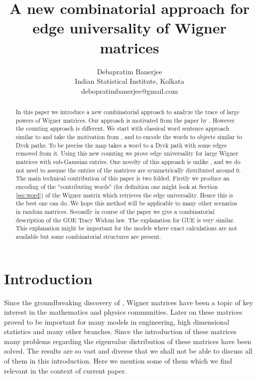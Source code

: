 \documentclass[12pt]{article}
\title{A new combinatorial approach for edge universality of Wigner matrices}
\author{
\sc Debapratim Banerjee
 \\ \small Indian Statistical Institute, Kolkata\\ debopratimbanerjee@gmail.com\\}
\numberwithin{equation}{section}
\numberwithin{equation}{section}
\theoremstyle{definition}
\renewcommand{\1}{\bf 1}
\begin{document}
 \maketitle
 \begin{abstract}
 In this paper we introduce a new combinatorial approach to analyze the trace of large powers of Wigner matrices. Our approach is motivated from the  paper by \citet{sosh}. However the counting approach is different. We start with classical word sentence approach similar to \citet{AZ05} and take the motivation from \citet{sinaisosh}, \citet{sosh} and \citet{peche2009universality} to encode the words to objects similar to Dyck paths. To be precise the map takes a word to a Dyck path with some edges removed from it. Using this new counting we prove edge universality for large Wigner matrices with sub-Gaussian entries. One novelty of this approach is unlike \citet{sinaisosh}, \citet{sosh} and \citet{peche2009universality} we do not need to assume the entries of the matrices are symmetrically distributed around $0$. The main technical contribution of this paper is two folded. Firstly we produce an encoding of the ``contributing words" (for definition one might look at Section \ref{sec:word}) of the Wigner matrix which retrieves the edge universality. Hence this is the best one can do. We hope this method will be applicable to many other scenarios in random matrices. Secondly in course of the paper we give a combinatorial description of the GOE Tracy Widom law. The explanation for GUE is very similar. This explanation might be important for the models where exact calculations are not available but some combinatorial structures are present.
 \end{abstract}
 \section{Introduction}
 Since the groundbreaking discovery of \citet{wig1}, Wigner matrices have been a topic of key interest in the mathematics and physics communities. Later on these matrices proved to be important for many models in engineering, high dimensional statistics and many other branches. Since the introduction of these matrices many problems regarding the eigenvalue distribution of these matrices have been solved. The results are so vast and diverse that we shall not be able to discuss all of them in this introduction. Here we mention some of them which we find relevant in the context of current paper. 
 
\end{document}
